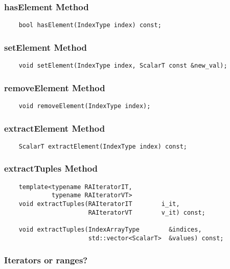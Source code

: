 {%
\subsubsection{{\sf hasElement} Method}
\begin{verbatim}
    bool hasElement(IndexType index) const;
\end{verbatim}

\subsubsection{{\sf setElement} Method}
\begin{verbatim}
    void setElement(IndexType index, ScalarT const &new_val);
\end{verbatim}

\subsubsection{{\sf removeElement} Method}
\begin{verbatim}
    void removeElement(IndexType index);
\end{verbatim}

\subsubsection{{\sf extractElement} Method}
\begin{verbatim}
    ScalarT extractElement(IndexType index) const;
\end{verbatim}


\subsubsection{{\sf extractTuples} Method}
\begin{verbatim}
    template<typename RAIteratorIT,
             typename RAIteratorVT>
    void extractTuples(RAIteratorIT        i_it,
                       RAIteratorVT        v_it) const;

    void extractTuples(IndexArrayType        &indices,
                       std::vector<ScalarT>  &values) const;
\end{verbatim}

\subsubsection{Iterators or ranges?}

}
